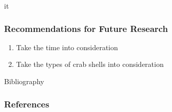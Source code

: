 it\documentclass[compress,handout,10pt]{beamer}
\let\olditem\item
\renewcommand{\item}{\setlength{\itemsep}{0.5\baselineskip}\olditem}
\begin{document}
\begin{frame}
    \frametitle{Recommendations for Future Research}
     \begin{enumerate}
         \item Take the time into consideration
         \item Take the types of crab shells into consideration
     \end{enumerate}
\end{frame}

\begin{frame}{Bibliography}
    \frametitle{References}
        
        \nocite{*}
        
\end{frame}
\end{document}
